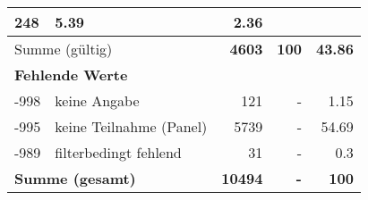 \begin{longtable}{lXrrr}
       \num{248} &
       \num[round-mode=places,round-precision=2]{5,39} &
         \num[round-mode=places,round-precision=2]{2,36} \\
     \midrule
     \multicolumn{2}{l}{Summe (gültig)} &
       \textbf{\num{4603}} &
     \textbf{100} &
       \textbf{\num[round-mode=places,round-precision=2]{43,86}} \\
     \multicolumn{5}{l}{\textbf{Fehlende Werte}}\\
       -998 &
       keine Angabe &
         \num{121} &
        - &
         \num[round-mode=places,round-precision=2]{1,15} \\
       -995 &
       keine Teilnahme (Panel) &
         \num{5739} &
        - &
         \num[round-mode=places,round-precision=2]{54,69} \\
       -989 &
       filterbedingt fehlend &
         \num{31} &
        - &
         \num[round-mode=places,round-precision=2]{0,3} \\
     \midrule
     \multicolumn{2}{l}{\textbf{Summe (gesamt)}} &
          \textbf{\num{10494}} &
        \textbf{-} &
        \textbf{100} \\
     \bottomrule
     \end{longtable}
     
